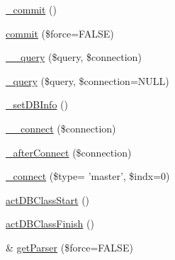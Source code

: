 \begin{DoxyCompactItemize}
\item 
\hyperlink{classDB_ae6b44dc80d78b7f73cb6741ff0d63399}{\+\_\+commit} ()
\item 
\hyperlink{classDB_a9e84ef91b522b1cd4d1f0f9a3fe3a57a}{commit} (\$force=F\+A\+L\+S\+E)
\item 
\hyperlink{classDB_a9e93ad499d34fefc40686d35ed9bf18f}{\+\_\+\+\_\+query} (\$query, \$connection)
\item 
\hyperlink{classDB_a740ea0f536b5ffacabf31b3a7473f5a7}{\+\_\+query} (\$query, \$connection=N\+U\+L\+L)
\item 
\hyperlink{classDB_a92f2478aeb03b00432332ad4e4a3d700}{\+\_\+set\+D\+B\+Info} ()
\item 
\hyperlink{classDB_a398b5d8142cab5920d3e037b4f22830e}{\+\_\+\+\_\+connect} (\$connection)
\item 
\hyperlink{classDB_ae9511581ab1229970e061e599b0f2f94}{\+\_\+after\+Connect} (\$connection)
\item 
\hyperlink{classDB_aaa2d517ff3b233e36c7873f288cb38ba}{\+\_\+connect} (\$type= 'master', \$indx=0)
\item 
\hyperlink{classDB_a5aa10d0d5f40cbd7c9b20a84b1c1c307}{act\+D\+B\+Class\+Start} ()
\item 
\hyperlink{classDB_abcdbf61ef5e7c96725c7ea2781f165f4}{act\+D\+B\+Class\+Finish} ()
\item 
\& \hyperlink{classDB_ac1222f2e7a1aae0fcd7d9e906a7a96ba}{get\+Parser} (\$force=F\+A\+L\+S\+E)
\end{DoxyCompactItemize}

